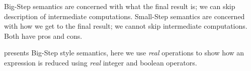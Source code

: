 Big-Step semantics are concerned with what the final result is; we can skip description of intermediate computations.
Small-Step semantics are concerned with how we get to the final result; we cannot skip intermediate computations.
Both have pros and cons.

 presents Big-Step style semantics, here we use \emph{real} operations to show how an expression is reduced using \emph{real} integer and boolean operators.
